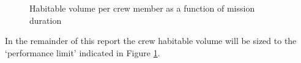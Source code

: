 \begin{figure}[h]
	\centering
	\setlength{} 
	\setlength{}
	
	\caption[Habitable volume per crew member as a function of mission duration]{Habitable volume per crew member as a function of mission duration \cite{Rudisill2008}}
	\label{fig:crewvolume}
\end{figure}

In the remainder of this report the crew habitable volume will be sized to the `performance limit' indicated in Figure \ref{fig:crewvolume}.
